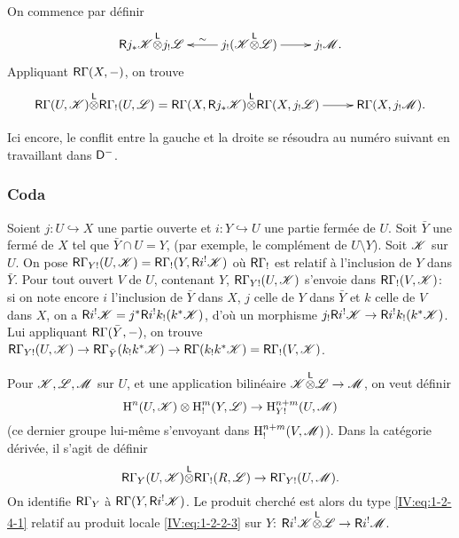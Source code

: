 On commence par définir 
\[\xymatrix{
  \R j_* \cK\lotimes j_! \cL 
    & \ar[l]_-\sim j_!(\cK\lotimes \cL) \ar[r] 
    & j_!\cM \text{.}
}\]
Appliquant $\mathsf{R}\Gamma(X,-)$, on trouve 
\[\xymatrix{
  \R\Gamma(U,\cK)\lotimes\R\Gamma_!(U,\cL) = \R\Gamma(X,\R j_*\cK)\lotimes \R\Gamma(X,j_!\cL) \ar[r] 
    & \R\Gamma(X,j_! \cM) \text{.}
}\]

Ici encore, le conflit entre la gauche et la droite se résoudra au numéro 
suivant en travaillant dans $\mathsf{D}^-$. 





\subsubsection{Coda}\label{IV:1-2-5}

Soient $j:U\hookrightarrow X$ une partie ouverte et $i:Y\hookrightarrow U$ une 
partie fermée de $U$. Soit $\bar Y$ une fermé de $X$ tel que 
$\bar Y\cap U=Y$, (par exemple, le complément de $U\setminus Y$). Soit $\mathscr{K}$ 
sur $U$. On pose $\mathsf{R}\Gamma_{Y!}(U,\mathscr{K})=\mathsf{R}\Gamma_!(Y,\mathsf{R} i^!\mathscr{K})$ où 
$\mathsf{R}\Gamma_!$ est relatif à l'inclusion de $Y$ dans $\bar Y$. Pour tout ouvert 
$V$ de $U$, contenant $Y$, $\mathsf{R}\Gamma_{Y!}(U,\mathscr{K})$ s'envoie dans 
$\mathsf{R}\Gamma_!(V,\mathscr{K})$: si on note encore $i$ l'inclusion de $\bar Y$ dans $X$, 
$j$ celle de $Y$ dans $\bar Y$ et $k$ celle de $V$ dans $X$, on a 
$\mathsf{R} i^!\mathscr{K} = j^*\mathsf{R} i^! k_!(k^*\mathscr{K})$, d'où un morphisme 
$j_!\mathsf{R} i^!\mathscr{K} \to \mathsf{R} i^! k_!(k^*\mathscr{K})$. Lui appliquant 
$\mathsf{R}\Gamma(\bar Y,-)$, on trouve 
$\mathsf{R}\Gamma_{Y!}(U,\mathscr{K})\to \mathsf{R}\Gamma_{\bar Y}(k_! k^* \mathscr{K}) \to \mathsf{R}\Gamma(k_! k^*\mathscr{K}) = \mathsf{R}\Gamma_!(V,\mathscr{K})$. 

Pour $\mathscr{K},\mathscr{L},\mathscr{M}$ sur $U$, et une application bilinéaire 
$\mathscr{K}{\overset{\mathsf{L}}{\otimes}}\mathscr{L}\to\mathscr{M}$, on veut définir 
\begin{equation}\label{IV:eq:1-2-5-1-1}
  \operatorname{H}^n(U,\mathscr{K})\otimes \operatorname{H}_!^m(Y,\mathscr{L}) \to \operatorname{H}_{Y!}^{n+m}(U,\mathscr{M})
\end{equation}
(ce dernier groupe lui-même s'envoyant dans $\operatorname{H}_!^{n+m}(V,\mathscr{M})$). Dans la 
catégorie dérivée, il s'agit de définir 
\begin{equation}\label{IV:eq:1-2-5-2}
  \mathsf{R}\Gamma_Y(U,\mathscr{K}) {\overset{\mathsf{L}}{\otimes}} \mathsf{R}\Gamma_!(R,\mathscr{L}) \to \mathsf{R}\Gamma_{Y!}(U,\mathscr{M}) \text{.}
\end{equation}
On identifie $\mathsf{R}\Gamma_Y$ à $\mathsf{R}\Gamma(Y,\mathsf{R} i^!\mathscr{K})$. Le produit cherché 
est alors du type \eqref{IV:eq:1-2-4-1} relatif au produit locale 
\eqref{IV:eq:1-2-2-3} sur $Y$: $\mathsf{R} i^! \mathscr{K}{\overset{\mathsf{L}}{\otimes}}\mathscr{L} \to \mathsf{R} i^! \mathscr{M}$. 






